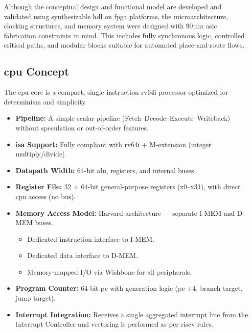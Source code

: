 Although the conceptual design and functional model are developed and validated using synthesizable \gls{hdl} on \gls{fpga} platforms, 
the microarchitecture, clocking structures, and memory system were designed with 90\,nm \gls{asic} fabrication constraints in mind.
This includes fully synchronous logic, controlled critical paths, and modular blocks suitable for automated place-and-route flows.

\subsection{\gls{cpu} Concept}
The \gls{cpu} core is a compact, single instruction \gls{rv64i} processor optimized for determinism and simplicity.

\begin{itemize}
    \item \textbf{Pipeline:} A simple scalar \gls{pipeline} (Fetch–Decode–Execute–Writeback) without speculation or out-of-order features.
    \item \textbf{\gls{isa} Support:} Fully compliant with \gls{rv64i} + M-extension (integer multiply/divide).
    \item \textbf{Datapath Width:} 64-bit \gls{alu}, registers, and internal buses.
    \item \textbf{Register File:} 32 × 64-bit general-purpose registers (x0–x31), with direct \gls{cpu} access (no bus).
    \item \textbf{Memory Access Model:} \gls{Harvard} architecture — separate \gls{I-MEM} and \gls{D-MEM} buses.
          \begin{itemize}
              \item Dedicated instruction interface to \gls{I-MEM}.
              \item Dedicated data interface to \gls{D-MEM}.
              \item Memory-mapped I/O via Wishbone for all peripherals.
          \end{itemize}
    \item \textbf{Program Counter:} 64-bit \gls{pc} with generation logic (\gls{pc} +4, branch target, jump target).
    \item \textbf{Interrupt Integration:} Receives a single aggregated interrupt line from the Interrupt Controller 
          and vectoring is performed as per \gls{riscv} rules.
\end{itemize}

